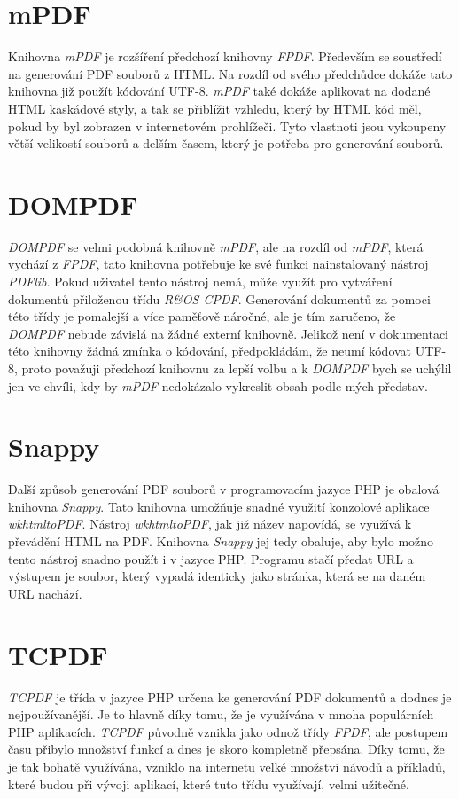 \documentclass[czech,BP]{thesiskiv}
\begin{document}
\section{mPDF}
Knihovna \emph{mPDF} je rozšíření předchozí knihovny \emph{FPDF}. Především se soustředí na generování PDF souborů z HTML. Na rozdíl od svého předchůdce dokáže tato knihovna již použít kódování UTF-8. \emph{mPDF} také dokáže aplikovat na dodané HTML kaskádové styly, a tak se přiblížit vzhledu, který by HTML kód měl, pokud by byl zobrazen v internetovém prohlížeči. Tyto vlastnoti jsou vykoupeny větší velikostí souborů a delším časem, který je potřeba pro generování souborů. \cite{mPDF}
\section{DOMPDF}
\emph{DOMPDF} se velmi podobná knihovně \emph{mPDF}, ale na rozdíl od \emph{mPDF}, která vychází z \emph{FPDF}, tato knihovna potřebuje ke své funkci nainstalovaný nástroj \emph{PDFlib}. Pokud uživatel tento nástroj nemá, může využít pro vytváření dokumentů přiloženou třídu \emph{R\&OS CPDF}. Generování dokumentů za pomoci této třídy je pomalejší a více paměťově náročné, ale je tím zaručeno, že \emph{DOMPDF} nebude závislá na žádné externí knihovně. Jelikož není v dokumentaci této knihovny žádná zmínka o kódování, předpokládám, že neumí kódovat UTF-8, proto považuji předchozí knihovnu za lepší volbu a k \emph{DOMPDF} bych se uchýlil jen ve chvíli, kdy by \emph{mPDF} nedokázalo vykreslit obsah podle mých představ.  \cite{DOMPDF}
\section{Snappy}
Další způsob generování PDF souborů v programovacím jazyce PHP je obalová knihovna \emph{Snappy}. Tato knihovna umožňuje snadné využití konzolové aplikace \emph{wkhtmltoPDF}. Nástroj \emph{wkhtmltoPDF}, jak již název napovídá, se využívá k převádění HTML na PDF. Knihovna \emph{Snappy} jej tedy obaluje, aby bylo možno tento nástroj snadno použít i v jazyce PHP. Programu stačí předat URL a výstupem je soubor, který vypadá identicky jako stránka, která se na daném URL nachází\cite{Snappy}\cite{wkhtmltoPDF}.
\section{TCPDF}
\emph{TCPDF} je třída v jazyce PHP určena ke generování PDF dokumentů a dodnes je nejpoužívanější. Je to hlavně díky tomu, že je využívána v mnoha populárních PHP aplikacích. \emph{TCPDF} původně vznikla jako odnož třídy \emph{FPDF}, ale postupem času přibylo množství funkcí a dnes je skoro kompletně přepsána. Díky tomu, že je tak bohatě využívána, vzniklo na internetu velké množství návodů a příkladů, které budou při vývoji aplikací, které tuto třídu využívají, velmi užitečné. 
\end{document}

